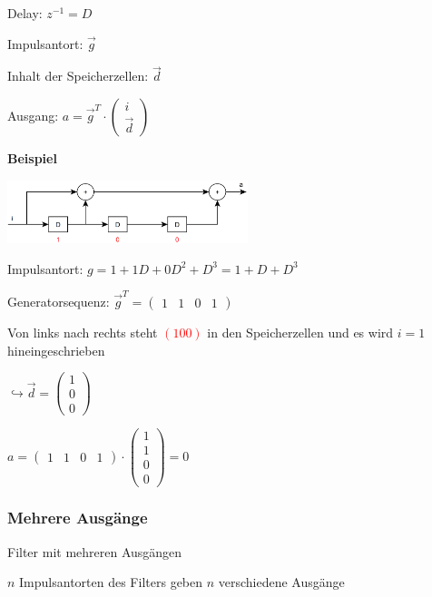 Delay: $z^{-1} = D$

Impulsantort: $\vec{g}$

Inhalt der Speicherzellen: $\vec{d}$

Ausgang: $\displaystyle{
    a = \vec{g}^T \cdot
    \begin{pmatrix}
        i\\
        \vec{d}
    \end{pmatrix}
}$

\textbf{Beispiel}

\includegraphics[width=7cm]{img/faltungscoder1in1out.PNG}

Impulsantort: $\displaystyle{
    g = 1 + 1D + 0D^2 + D^3 = 1 + D + D^3
}$

Generatorsequenz: $\displaystyle{\vec{g}^T =
    \begin{pmatrix}
        1 & 1 & 0 & 1
    \end{pmatrix}
}$

Von links nach rechts steht \textcolor{red}{$ (1 0 0) $} in den Speicherzellen und es wird $i = 1$ hineingeschrieben

$\displaystyle{
    \hookrightarrow \vec{d} = \begin{pmatrix}
        1\\
        0\\
        0
    \end{pmatrix}
}$

$\displaystyle{
    a = \begin{pmatrix}
        1 & 1 & 0 & 1
    \end{pmatrix}
    \cdot
    \begin{pmatrix}
        1\\
        1\\
        0\\
        0
    \end{pmatrix}
    = 0    
}$

\subsubsection{Mehrere Ausgänge}

Filter mit mehreren Ausgängen

$n$ Impulsantorten des Filters geben $n$ verschiedene Ausgänge

